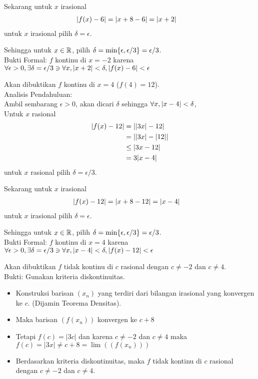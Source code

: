\documentclass{article}
\begin{document}
\begin{enumerate}[leftmargin=*, label={\arabic*}.]
Sekarang untuk $x$ irasional
\begin{align*}
    |f(x)-6| &= \lvert x+8-6\rvert=|x+2|
\end{align*}
untuk $x$ irasional pilih $\delta = \epsilon$.

Sehingga untuk $x \in \mathbb{R}$, pilih $\delta = \min\{\epsilon,\epsilon/3\}=\epsilon/3$.\\
Bukti Formal: $f$ kontinu di $x=-2$ karena\\
$\forall \epsilon > 0, \exists \delta = \epsilon/3 \ni \forall x, \lvert x+2\rvert < \delta, \lvert f(x)-6\rvert < \epsilon$

Akan dibuktikan $f$ kontinu di $x=4$ ($f(4)=12$).\\
Analisis Pendahuluan:\\
Ambil sembarang $\epsilon > 0$, akan dicari $\delta$ sehingga $\forall x, \lvert x-4\rvert<\delta$,\\
Untuk $x$ rasional
\begin{align*}
    |f(x)-12| &= \lvert\lvert3x\rvert-12\rvert \\
    &= \lvert\lvert3x\rvert-\lvert12\rvert\rvert\\
    &\leq |3x-12|\\
    &=3|x-4|
\end{align*}
untuk $x$ rasional pilih $\delta = \epsilon/3$.

Sekarang untuk $x$ irasional
\begin{align*}
    |f(x)-12| &= \lvert x+8-12\rvert=|x-4|
\end{align*}
untuk $x$ irasional pilih $\delta = \epsilon$.

Sehingga untuk $x \in \mathbb{R}$, pilih $\delta = \min\{\epsilon,\epsilon/3\}=\epsilon/3$.\\
Bukti Formal: $f$ kontinu di $x=4$ karena\\
$\forall \epsilon > 0, \exists \delta = \epsilon/3 \ni \forall x, \lvert x-4\rvert < \delta, \lvert f(x)-12\rvert < \epsilon$

Akan dibuktikan $f$ tidak kontinu di $c$ rasional dengan $c\neq -2$ dan $c\neq 4$.\\
Bukti: Gunakan kriteria diskontinuitas.
\begin{itemize}
    \item Konstruksi barisan $(x_n)$ yang terdiri dari bilangan irasional yang konvergen ke $c$. (Dijamin Teorema Densitas).
    \item Maka barisan $(f(x_n))$ konvergen ke $c+8$
    \item Tetapi $f(c) = |3c|$ dan karena $c\neq -2$ dan $c\neq 4$ maka $f(c) = |3x| \neq c+8 = \lim((f(x_n)))$
    \item Berdasarkan kriteria diskontinuitas, maka $f$ tidak kontinu di $c$ rasional dengan $c\neq -2$ dan $c\neq 4$.
\end{itemize}


\end{enumerate}
\end{document}
